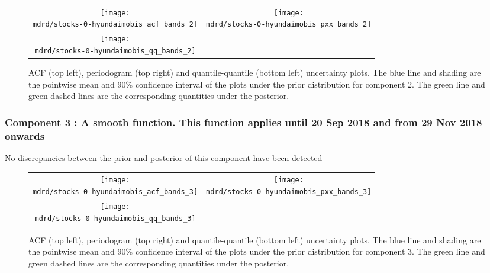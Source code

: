 \documentclass{article} %
\begin{document}
\begin{figure}[H]
\newcommand{\wmgd}{0.5\columnwidth}
\newcommand{\hmgd}{3.0cm}
\newcommand{\mdrd}{stocks-0-hyundaimobis}
\newcommand{\mbm}{\hspace{-0.3cm}}
\begin{tabular}{cc}
\mbm \texttt{[image: \\mdrd/stocks-0-hyundaimobis\_acf\_bands\_2]} & \texttt{[image: \\mdrd/stocks-0-hyundaimobis\_pxx\_bands\_2]} \\
\mbm \texttt{[image: \\mdrd/stocks-0-hyundaimobis\_qq\_bands\_2]}
\end{tabular}
\caption{
ACF (top left), periodogram (top right) and quantile-quantile (bottom left) uncertainty plots.
The blue line and shading are the pointwise mean and 90\% confidence interval of the plots under the prior distribution for component 2.
The green line and green dashed lines are the corresponding quantities under the posterior.}
\label{fig:check2}
\end{figure}

\subsubsection{Component 3 : A smooth function. This function applies until 20 Sep 2018 and from 29 Nov 2018 onwards}

No discrepancies between the prior and posterior of this component have been detected

\begin{figure}[H]
\newcommand{\wmgd}{0.5\columnwidth}
\newcommand{\hmgd}{3.0cm}
\newcommand{\mdrd}{stocks-0-hyundaimobis}
\newcommand{\mbm}{\hspace{-0.3cm}}
\begin{tabular}{cc}
\mbm \texttt{[image: \\mdrd/stocks-0-hyundaimobis\_acf\_bands\_3]} & \texttt{[image: \\mdrd/stocks-0-hyundaimobis\_pxx\_bands\_3]} \\
\mbm \texttt{[image: \\mdrd/stocks-0-hyundaimobis\_qq\_bands\_3]}
\end{tabular}
\caption{
ACF (top left), periodogram (top right) and quantile-quantile (bottom left) uncertainty plots.
The blue line and shading are the pointwise mean and 90\% confidence interval of the plots under the prior distribution for component 3.
The green line and green dashed lines are the corresponding quantities under the posterior.}
\label{fig:check3}
\end{figure}
\end{document}
